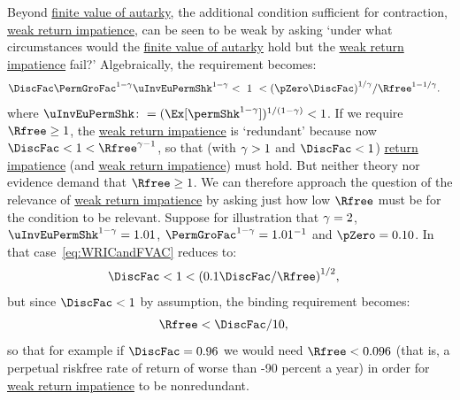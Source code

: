 \documentclass[BufferStockTheory]{subfiles}
\begin{document}
Beyond \hyperlink{FVAC}{finite value of autarky},
the additional condition sufficient for contraction, \hyperlink{WRIC}{weak return impatience}, can be seen to be weak by asking `under what circumstances would the \hyperlink{FVAC}{finite value of autarky} hold but the \hyperlink{WRIC}{weak return impatience} fail?'  Algebraically, the requirement becomes:
%
\begin{equation}\begin{gathered}\begin{aligned}
  \DiscFac \PermGroFac^{1-\CRRA}\uInvEuPermShk^{1-\CRRA} & < ~ 1 ~ <  {(\pZero \DiscFac)}^{1/\CRRA}/\Rfree^{1-1/\CRRA}. \label{eq:WRICandFVAC}
\end{aligned}\end{gathered}\end{equation}
%
where $\uInvEuPermShk \colon = (\Ex[\permShk^{1-\CRRA}])^{1/(1-\CRRA)} < 1$.
If we require $\Rfree \geq 1$, the \hyperlink{WRIC}{weak return impatience} is `redundant' because now $\DiscFac <1<\Rfree^{\CRRA-1}$, so that (with $\gamma > 1$ and $\DiscFac<1$) \hyperlink{RIC}{return impatience} (and \hyperlink{WRIC}{weak return impatience}) must hold.
But neither theory nor evidence demand that $\Rfree \geq 1$.
We can therefore approach the question of the relevance of \hyperlink{WRIC}{weak return impatience}  by asking just how low $\Rfree$ must be for the condition to be relevant.
Suppose for illustration that $\gamma=2$, $\uInvEuPermShk^{1-\CRRA}=1.01$, $\PermGroFac^{1-\CRRA}=1.01^{-1}$ and $\pZero = 0.10$.
In that case~\eqref{eq:WRICandFVAC} reduces to:
\begin{equation}\begin{gathered}\begin{aligned}
  \DiscFac  & < 1 < {(0.1 \DiscFac/\Rfree)}^{1/2},
\end{aligned}\end{gathered}\end{equation}
but since $\DiscFac < 1$ by assumption, the binding requirement becomes:
\begin{equation}\begin{gathered}\begin{aligned}
  \Rfree  & < \DiscFac/10, \notag
\end{aligned}\end{gathered}\end{equation}
so that for example if $\DiscFac=0.96$ we would need $\Rfree < 0.096$ (that is, a perpetual riskfree rate of return of worse than -90 percent a year) in order for \hyperlink{WRIC}{weak return impatience} to be nonredundant.
\end{document}
